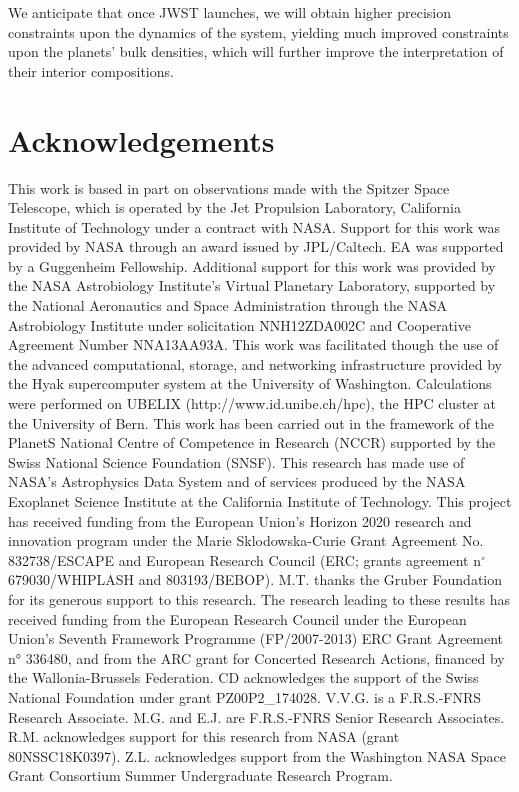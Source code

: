 \documentclass[fleqn,usenatbib]{mnras} %
\begin{document}
We anticipate that once JWST launches, we will obtain higher precision constraints upon the dynamics of the system, yielding much improved constraints upon the planets' bulk densities, which will further improve the interpretation of their interior compositions.

\section*{Acknowledgements}

This work is based in part on observations made with the Spitzer Space Telescope, which 
is operated by the Jet Propulsion Laboratory, California Institute of Technology under 
a contract with NASA. Support for this work was provided by NASA through an award issued 
by JPL/Caltech.  EA was supported by a Guggenheim Fellowship.  Additional support for this 
work was provided by the NASA Astrobiology Institute’s Virtual Planetary Laboratory, 
supported by the National  Aeronautics and Space Administration through the NASA Astrobiology 
Institute under solicitation NNH12ZDA002C and Cooperative Agreement Number NNA13AA93A.  
This work was facilitated though the use of the advanced computational, storage, and 
networking infrastructure provided by the Hyak supercomputer system at the University of 
Washington. Calculations were performed on UBELIX (http://www.id.unibe.ch/hpc), the HPC 
cluster at the University of Bern. This work has been carried out in the framework of the PlanetS National Centre 
of Competence in Research (NCCR) supported by the Swiss National Science Foundation (SNSF). 
This research has made use of NASA's Astrophysics Data System and of services produced by 
the NASA Exoplanet Science Institute at the California Institute of Technology.
This project has received funding from the European Union’s Horizon 2020 research and 
innovation program under the Marie Sklodowska-Curie Grant Agreement No. 832738/ESCAPE and European Research Council (ERC; grants agreement n$^\circ$ 679030/WHIPLASH and 803193/BEBOP). M.T. 
thanks the Gruber Foundation for its generous support to this research.
The research leading to these results has received funding from the European Research Council 
under the European Union's Seventh Framework Programme (FP/2007-2013) ERC Grant 
Agreement n° 336480, and from the ARC grant for Concerted Research Actions, financed by the
Wallonia-Brussels Federation. CD acknowledges the support of the Swiss National Foundation under grant PZ00P2\_174028. V.V.G. is a F.R.S.-FNRS Research Associate. M.G. and E.J. are F.R.S.-FNRS Senior Research Associates. R.M. acknowledges support for this research from NASA (grant 80NSSC18K0397). Z.L. acknowledges support from the Washington NASA Space Grant Consortium Summer Undergraduate Research Program. 
\end{document}

